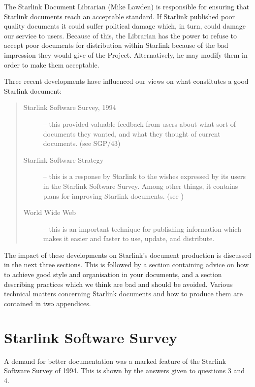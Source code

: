 The Starlink Document Librarian (Mike Lawden) is responsible for ensuring that
Starlink documents reach an acceptable standard.
If Starlink published poor quality documents it could suffer political damage
which, in turn, could damage our service to users.
Because of this, the Librarian has the power to refuse to accept poor
documents for distribution within Starlink because of the bad impression they
would give of the Project.
Alternatively, he may modify them in order to make them acceptable.

Three recent developments have influenced our views on what constitutes a good
Starlink document:

\begin{quote}
\begin{description}

\item [Starlink Software Survey, 1994] -- this provided valuable feedback
from users about what sort of documents they wanted, and what they thought
of current documents. (see SGP/43)

\item [Starlink Software Strategy] -- this is a response by Starlink to the
wishes expressed by its users in the Starlink Software Survey.
Among other things, it contains plans for improving Starlink documents.
(see )

\item [World Wide Web] -- this is an important technique for publishing
information which makes it easier and faster to use, update, and distribute.

\end{description}
\end{quote}

The impact of these developments on Starlink's document production is discussed
in the next three sections.
This is followed by a section containing advice on how to achieve good style and
organisation in your documents, and a section describing practices which
we think are bad and should be avoided.
Various technical matters concerning Starlink documents and how to produce
them are contained in two appendices.

\section{Starlink Software Survey}

A demand for better documentation was a marked feature of the Starlink
Software Survey of 1994.
This is shown by the answers given to questions 3 and 4.

